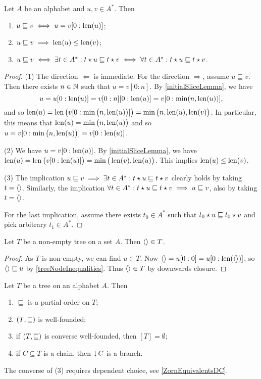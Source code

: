 \begin{lemma} \label{treeNodeInequalities}
Let $A$ be an alphabet and $u,v\in A^*$. Then
\begin{enumerate}
\item $u \sqsubseteq v \iff u = v[0:\operatorname{len}(u)]$;
\item $u \sqsubseteq v \implies \operatorname{len}(u) \leq \operatorname{len}(v)$;
\item $u \sqsubseteq v \iff \exists t\in A^*: t\star u \sqsubseteq t\star v \iff \forall t\in A^*: t\star u \sqsubseteq t\star v$.
\end{enumerate}
\end{lemma}
\begin{proof}
(1) The direction $\Leftarrow$ is immediate. For the direction $\Rightarrow$, assume $u \sqsubseteq v$. Then there exists $n\in \mathbb{N}$ such that $u = v[0:n]$. By \ref{initialSliceLemma}, we have
\[ u = u[0:\operatorname{len}(u)] = v[0:n][0:\operatorname{len}(u)] = v[0:\min(n,\operatorname{len}(u))], \]
and so $\operatorname{len}(u) = \operatorname{len}\big(v[0:\min\big(n,\operatorname{len}(u)\big)]\big) = \min\big(n,\operatorname{len}(u), \operatorname{len}(v)\big)$. In particular, this means that $\operatorname{len}(u) = \min\big(n,\operatorname{len}(u)\big)$ and so $u = v[0:\min\big(n,\operatorname{len}(u)\big)] = v[0:\operatorname{len}(u)]$.

(2) We have $u = v[0:\operatorname{len}(u)]$. By \ref{initialSliceLemma}, we have $\operatorname{len}(u) = \operatorname{len}\big(v[0:\operatorname{len}(u)]\big) = \min\big(\operatorname{len}(v), \operatorname{len}(u)\big)$. This implies $\operatorname{len}(u) \leq \operatorname{len}(v)$.

(3) The implication $u \sqsubseteq v \implies \exists t\in A^*: t\star u \sqsubseteq t\star v$ clearly holds by taking $t=\left\langle  \right\rangle$. Similarly, the implication $\forall t\in A^*: t\star u \sqsubseteq t\star v \implies u \sqsubseteq v$, also by taking $t=\left\langle  \right\rangle$.

For the last implication, assume there exists $t_0\in A^*$ such that $t_0\star u \sqsubseteq t_0\star v$ and pick arbitrary $t_1\in A^*$.
\end{proof}

\begin{lemma}
Let $T$ be a non-empty tree on a set $A$. Then $\left\langle  \right\rangle\in T$.
\end{lemma}
\begin{proof}
As $T$ is non-empty, we can find $u\in T$. Now $\left\langle  \right\rangle = u[0:0] = u[0:\operatorname{len}(\left\langle  \right\rangle)]$, so $\left\langle  \right\rangle\sqsubseteq u$ by \ref{treeNodeInequalities}. Thus $\left\langle  \right\rangle\in T$ by downwards closure.
\end{proof}

\begin{lemma} \label{treeOrderingLemma}
Let $T$ be a tree on an alphabet $A$. Then
\begin{enumerate}
\item $\sqsubseteq$ is a partial order on $T$;
\item $\sSet{T,\sqsubseteq}$ is well-founded;
\item if $\sSet{T,\sqsubseteq}$ is converse well-founded, then $[T] = \emptyset$;
\item if $C\subseteq T$ is a chain, then $\operatorname{\downarrow} C$ is a branch.
\end{enumerate}
\end{lemma}
The converse of (3) requires dependent choice, see \ref{ZornEquivalentsDC}.

